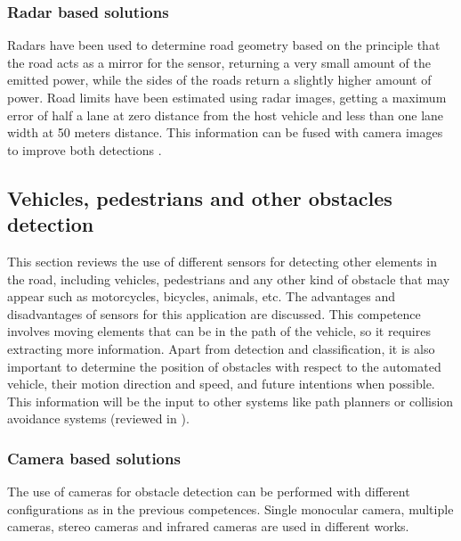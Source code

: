 
\subsubsection{Radar based solutions}
Radars have been used to determine road geometry based on the principle that the
road acts as a mirror for the sensor, returning a very small amount of the 
emitted power, while the sides of the roads return a slightly higher 
amount of power. Road limits have been estimated using radar images, getting a 
maximum error of half a lane at zero distance from the host vehicle and less 
than one lane width at 50 meters distance. This information can be fused with
camera images to improve both detections 
\cite{kaliyaperumal2001algorithm, ma2000simultaneous, Janda2013}.

\subsection{Vehicles, pedestrians and other obstacles detection}
This section reviews the use of different sensors for detecting other elements 
in the road, including vehicles, pedestrians and any other kind of obstacle 
that may appear such as motorcycles, bicycles, animals, etc. 
The advantages and disadvantages of sensors for this application are discussed.
This competence involves moving elements that can be in the path of the 
vehicle, so it requires extracting more information. Apart from detection and 
classification, it is also important to determine the position of obstacles 
with 
respect to the automated vehicle, their motion direction and speed, and future 
intentions when possible. 
This information will be the input to other systems like path planners 
or collision avoidance systems (reviewed in \cite{mukhtar2015vehicle}).

\subsubsection{Camera based solutions}
The use of cameras for obstacle detection can be performed with different 
configurations as in the previous competences. Single monocular 
camera, multiple cameras, stereo cameras and infrared cameras are used in 
different works.

